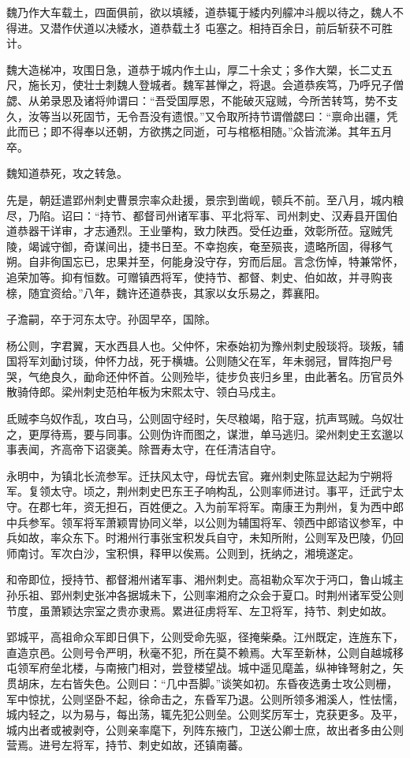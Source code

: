 \documentclass[12pt,UTF8]{ctexbook}
\begin{document}
魏乃作大车载土，四面俱前，欲以填緌，道恭辄于緌内列艨冲斗舰以待之，魏人不得进。又潜作伏道以决緌水，道恭载土犭屯塞之。相持百余日，前后斩获不可胜计。

魏大造梯冲，攻围日急，道恭于城内作土山，厚二十余丈；多作大槊，长二丈五尺，施长刃，使壮士刺魏人登城者。魏军甚惮之，将退。会道恭疾笃，乃呼兄子僧勰、从弟录恩及诸将帅谓曰：“吾受国厚恩，不能破灭寇贼，今所苦转笃，势不支久，汝等当以死固节，无令吾没有遗恨。”又令取所持节谓僧勰曰：“禀命出疆，凭此而已；即不得奉以还朝，方欲携之同逝，可与棺柩相随。”众皆流涕。其年五月卒。

魏知道恭死，攻之转急。

先是，朝廷遣郢州刺史曹景宗率众赴援，景宗到凿岘，顿兵不前。至八月，城内粮尽，乃陷。诏曰：“持节、都督司州诸军事、平北将军、司州刺史、汉寿县开国伯道恭器干详审，才志通烈。王业肇构，致力陕西。受任边垂，效彰所莅。寇贼凭陵，竭诚守御，奇谋间出，捷书日至。不幸抱疾，奄至殒丧，遗略所固，得移气朔。自非徇国忘已，忠果并至，何能身没守存，穷而后屈。言念伤悼，特兼常怀，追荣加等。抑有恒数。可赠镇西将军，使持节、都督、刺史、伯如故，并寻购丧榇，随宜资给。”八年，魏许还道恭丧，其家以女乐易之，葬襄阳。

子澹嗣，卒于河东太守。孙固早卒，国除。

杨公则，字君翼，天水西县人也。父仲怀，宋泰始初为豫州刺史殷琰将。琰叛，辅国将军刘勔讨琰，仲怀力战，死于横塘。公则随父在军，年未弱冠，冒阵抱尸号哭，气绝良久，勔命还仲怀首。公则殓毕，徒步负丧归乡里，由此著名。历官员外散骑侍郎。梁州刺史范柏年板为宋熙太守、领白马戍主。

氐贼李乌奴作乱，攻白马，公则固守经时，矢尽粮竭，陷于寇，抗声骂贼。乌奴壮之，更厚待焉，要与同事。公则伪许而图之，谋泄，单马逃归。梁州刺史王玄邈以事表闻，齐高帝下诏褒美。除晋寿太守，在任清洁自守。

永明中，为镇北长流参军。迁扶风太守，母忧去官。雍州刺史陈显达起为宁朔将军。复领太守。顷之，荆州刺史巴东王子响构乱，公则率师进讨。事平，迁武宁太守。在郡七年，资无担石，百姓便之。入为前军将军。南康王为荆州，复为西中郎中兵参军。领军将军萧颖胃协同义举，以公则为辅国将军、领西中郎谘议参军，中兵如故，率众东下。时湘州行事张宝积发兵自守，未知所附，公则军及巴陵，仍回师南讨。军次白沙，宝积惧，释甲以俟焉。公则到，抚纳之，湘境遂定。

和帝即位，授持节、都督湘州诸军事、湘州刺史。高祖勒众军次于沔口，鲁山城主孙乐祖、郢州刺史张冲各据城未下，公则率湘府之众会于夏口。时荆州诸军受公则节度，虽萧颖达宗室之贵亦隶焉。累进征虏将军、左卫将军，持节、刺史如故。

郢城平，高祖命众军即日俱下，公则受命先驱，径掩柴桑。江州既定，连旌东下，直造京邑。公则号令严明，秋毫不犯，所在莫不赖焉。大军至新林，公则自越城移屯领军府垒北楼，与南掖门相对，尝登楼望战。城中遥见麾盖，纵神锋弩射之，矢贯胡床，左右皆失色。公则曰：“几中吾脚。”谈笑如初。东昏夜选勇士攻公则栅，军中惊扰，公则坚卧不起，徐命击之，东昏军乃退。公则所领多湘溪人，性怯懦，城内轻之，以为易与，每出荡，辄先犯公则垒。公则奖厉军士，克获更多。及平，城内出者或被剥夺，公则亲率麾下，列阵东掖门，卫送公卿士庶，故出者多由公则营焉。进号左将军，持节、刺史如故，还镇南蕃。
\end{document}
